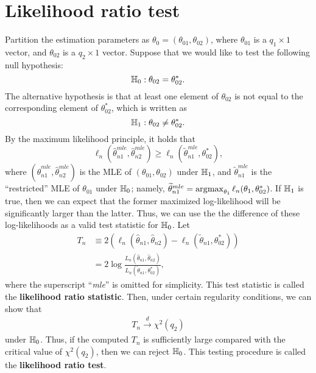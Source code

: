 \documentclass[11pt, A4paper, openany, uplatex]{book}
\begin{document}
\section{Likelihood ratio test}\label{sec:LRT}
Partition the estimation parameters as $\theta_0 = (\theta_{01}, \theta_{02})$, where $\theta_{01}$ is a $q_1 \times 1$ vector, and $\theta_{02}$ is a $q_2 \times 1$ vector.
Suppose that we would like to test the following null hypothesis:
\[
	\mathbb{H}_0: \theta_{02} = \theta_{02}^*.
\]
The alternative hypothesis is that at least one element of $\theta_{02}$ is not equal to the corresponding element of $\theta_{02}^*$, which is written as
\[
	\mathbb{H}_1: \theta_{02} \neq \theta_{02}^*.
\]
By the maximum likelihood principle, it holds that 
\[
	\ell_n(\hat \theta_{n1}^{mle}, \hat \theta_{n2}^{mle}) \ge \ell_n(\tilde \theta_{n1}^{mle}, \theta_{02}^*),
\]
where $(\hat \theta_{n1}^{mle}, \hat \theta_{n2}^{mle})$ is the MLE of $(\theta_{01}, \theta_{02})$ under $\mathbb{H}_1$, and $\tilde \theta_{n1}^{mle}$ is the ``restricted'' MLE of $\theta_{01}$ under $\mathbb{H}_0$; namely, $\widetilde \theta_{n1}^{mle} = \operatorname*{\arg\!\max}_{\theta_1} \ell_n(\theta_1, \theta_{02}^*)$.
If $\mathbb{H}_1$ is true, then we can expect that the former maximized log-likelihood will be significantly larger than the latter.
Thus, we can use the the difference of these log-likelihoods as a valid test statistic for $\mathbb{H}_0$.
Let
\begin{align*}
	T_n 
	& \equiv 2\left(\ell_n(\hat \theta_{n1}, \hat \theta_{n2}) - \ell_n(\tilde \theta_{n1}, \theta_{02}^*) \right)\\
	& = 2 \log \frac{L_n( \hat \theta_{n1}, \hat \theta_{n2})}{L_n( \tilde \theta_{n1}, \theta_{02}^*)},
\end{align*}
where the superscript ``\textit{mle}'' is omitted for simplicity.
This test statistic is called the \textbf{likelihood ratio statistic}. 
Then, under certain regularity conditions, we can show that 
\begin{align}\label{eq:LRT}
T_n \overset{d}{\to} \chi^2(q_2)
\end{align}
under $\mathbb{H}_0$.
Thus, if the computed $T_n$ is sufficiently large compared with the critical value of $\chi^2(q_2)$, then we can reject $\mathbb{H}_0$.
This testing procedure is called the \textbf{likelihood ratio test}.
\bigskip
\end{document}
